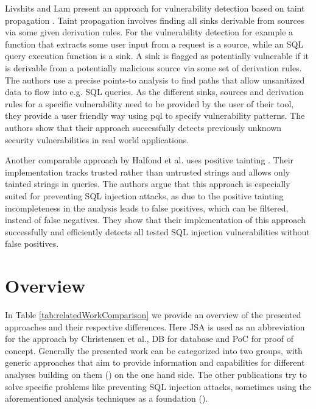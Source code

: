 Livshits and Lam present an approach for vulnerability detection based on taint propagation \cite{livshits2005}.
Taint propagation involves finding all sinks derivable from sources via some given derivation rules. For the vulnerability detection for example a function that extracts some user input from a request is a source, while an SQL query execution function is a sink. A sink is flagged as potentially vulnerable if it is derivable from a potentially malicious source via some set of derivation rules. The authors use a precise points-to analysis to find paths that allow unsanitized data to flow into e.g. SQL queries.
As the different sinks, sources and derivation rules for a specific vulnerability need to be provided by the user of their tool, they provide a user friendly way using \ac{pql} to specify vulnerability patterns. 
The authors show that their approach successfully detects previously unknown security vulnerabilities in real world applications.

Another comparable approach by Halfond et al. uses positive tainting \cite{wasp}. Their implementation tracks trusted rather than untrusted strings and allows only tainted strings in queries. The authors argue that this approach is especially suited for preventing SQL injection attacks, as due to the positive tainting incompleteness in the analysis leads to false positives, which can be filtered, instead of false negatives. They show that their implementation of this approach successfully and efficiently detects all tested SQL injection vulnerabilities without false positives.

\section{Overview}

In Table \ref{tab:relatedWorkComparison} we provide an overview of the presented approaches and their respective differences. Here JSA is used as an abbreviation for the approach by Christensen et al., DB for database and PoC for proof of concept. Generally the presented work can be categorized into two groups, with generic approaches that aim to provide information and capabilities for different analyses building on them (\cite{brics}\cite{banshee}\cite{regex_types}) on the one hand side. The other publications try to solve specific problems like preventing SQL injection attacks, sometimes using the aforementioned analysis techniques as a foundation (\cite{gould2004static}\cite{amnesia}\cite{wasp}\cite{xduce}\cite{xact}\cite{livshits2005}\cite{sqli_wassermann_su}).

